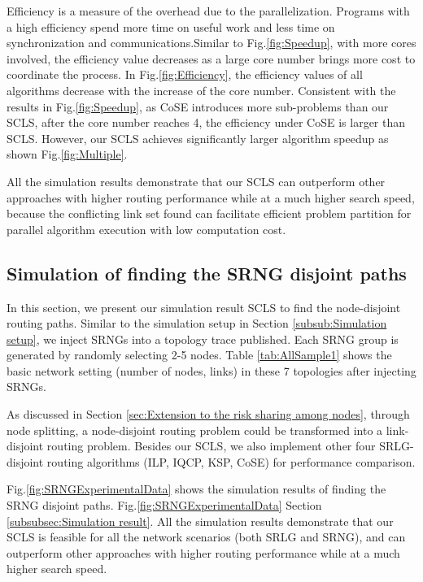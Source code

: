 Efficiency is a measure of the overhead due to the parallelization. Programs with a high efficiency spend more time on useful work and less time on synchronization and communications.Similar to Fig.\ref{fig:Speedup}, with more cores involved, the efficiency value decreases  as a large core number brings more cost to coordinate the process. In Fig.\ref{fig:Efficiency}, the efficiency values of all algorithms decrease with the increase of the core number. Consistent with the results in Fig.\ref{fig:Speedup}, as CoSE introduces more sub-problems than our SCLS, after the core number reaches 4, the efficiency under CoSE is larger than SCLS. However, our SCLS achieves significantly larger algorithm speedup as shown Fig.\ref{fig:Multiple}. %

All the simulation results demonstrate that our SCLS can outperform other approaches with higher routing performance while at a much higher search speed, because the  conflicting link set found can facilitate efficient problem partition for parallel algorithm execution with low computation cost.

\subsection{Simulation of finding the SRNG disjoint paths}
In this section, we present our simulation result  SCLS to find the node-disjoint routing paths. Similar to the simulation setup in Section \ref{subsub:Simulation setup}, we inject SRNGs into a topology trace published. Each SRNG group is generated by randomly selecting 2-5 nodes. Table \ref{tab:AllSample1} shows the basic network setting (number of nodes, links) in these 7 topologies after injecting SRNGs.

As discussed in Section \ref{sec:Extension to the risk sharing among nodes}, through  node splitting,  a node-disjoint routing problem could be transformed into a link-disjoint routing problem. Besides our SCLS, we also implement other four SRLG-disjoint routing algorithms (ILP, IQCP, KSP, CoSE) for performance comparison.

Fig.\ref{fig:SRNGExperimentalData} shows the simulation results of finding the SRNG disjoint paths. Fig.\ref{fig:SRNGExperimentalData}   Section \ref{subsubsec:Simulation result}. All the simulation results demonstrate that our SCLS is feasible for all the network scenarios (both SRLG and SRNG), and can outperform other approaches with higher routing performance while at a much higher search speed.


